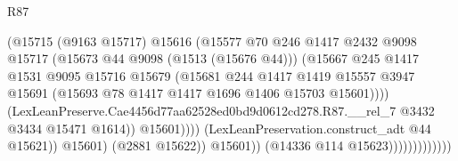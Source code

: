 \begin{lexlean}{R87}
\begin{coremodule}
{{                                              (@15715
                                                (@9163 @15717)
                                                @15616
                                                (@15577
                                                  @70
                                                  @246
                                                  @1417
                                                  @2432
                                                  @9098
                                                  @15717
                                                  (@15673 @44 @9098 (@1513 (@15676 @44)))
                                                  (@15667
                                                    @245
                                                    @1417
                                                    @1531
                                                    @9095
                                                    @15716
                                                    @15679
                                                    (@15681
                                                      @244
                                                      @1417
                                                      @1419
                                                      @15557
                                                      @3947
                                                      @15691
                                                      (@15693
                                                        @78
                                                        @1417
                                                        @1417
                                                        @1696
                                                        @1406
                                                        @15703
                                                        @15601))))
                                                (LexLeanPreserve.Cae4456d77aa62528ed0bd9d0612cd278.R87.__rel_7
                                                  @3432
                                                  @3434
                                                  @15471
                                                  @1614))
                                              @15601))))
                                      (LexLeanPreservation.construct_adt @44 @15621))
                                    @15601)
                                  (@2881 @15622))
                                @15601))
                            (@14336 @114 @15623)))))))))))))
}}
\end{coremodule}
\end{lexlean}
